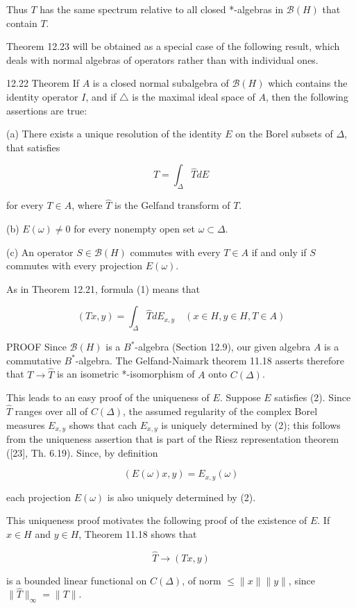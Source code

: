 \documentclass[10pt]{article}
\begin{document}
Thus $T$ has the same spectrum relative to all closed *-algebras in $\mathscr{B}(H)$ that contain $T$.

Theorem 12.23 will be obtained as a special case of the following result, which deals with normal algebras of operators rather than with individual ones.

12.22 Theorem If $A$ is a closed normal subalgebra of $\mathscr{B}(H)$ which contains the identity operator $I$, and if $\triangle$ is the maximal ideal space of $A$, then the following assertions are true:

(a) There exists a unique resolution of the identity $E$ on the Borel subsets of $\Delta$, that satisfies

$$
T=\int_{\Delta} \hat{T} d E
$$

for every $T \in A$, where $\hat{T}$ is the Gelfand transform of $T$.

(b) $E(\omega) \neq 0$ for every nonempty open set $\omega \subset \Delta$.

(c) An operator $S \in \mathscr{B}(H)$ commutes with every $T \in A$ if and only if $S$ commutes with every projection $E(\omega)$.

As in Theorem 12.21, formula (1) means that

$$
(T x, y)=\int_{\Delta} \hat{T} d E_{x, y} \quad(x \in H, y \in H, T \in A)
$$

PROOF Since $\mathscr{B}(H)$ is a $B^{*}$-algebra (Section 12.9), our given algebra $A$ is a commutative $B^{*}$-algebra. The Gelfand-Naimark theorem 11.18 asserts therefore that $T \rightarrow \hat{T}$ is an isometric *-isomorphism of $A$ onto $C(\Delta)$.

This leads to an easy proof of the uniqueness of $E$. Suppose $E$ satisfies (2). Since $\hat{T}$ ranges over all of $C(\Delta)$, the assumed regularity of the complex Borel measures $E_{x, y}$ shows that cach $E_{x, y}$ is uniquely determined by (2); this follows from the uniqueness assertion that is part of the Riesz representation theorem ([23], Th. 6.19). Since, by definition

$$
(E(\omega) x, y)=E_{x, y}(\omega)
$$

each projection $E(\omega)$ is also uniquely determined by (2).

This uniqueness proof motivates the following proof of the existence of $E$. If $x \in H$ and $y \in H$, Theorem 11.18 shows that

$$
\hat{T} \rightarrow(T x, y)
$$

is a bounded linear functional on $C(\Delta)$, of norm $\leq\|x\|\|y\|$, since $\|\hat{T}\|_{\infty}=\|T\|$.
\end{document}
